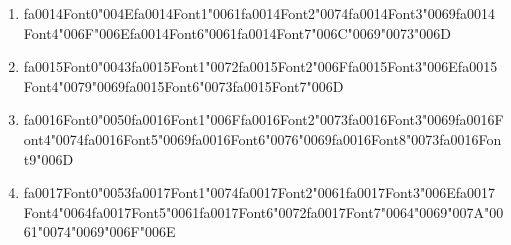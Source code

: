 \documentclass[12pt]{article}
\begin{document}
\begin{enumerate}[label=\arabic*.]
\begin{enumerate}[label=(\alph*)]
    \item {\csname fa0014Font0\endcsname\char"004E}{\csname fa0014Font1\endcsname\char"0061}{\csname fa0014Font2\endcsname\char"0074}{\csname fa0014Font3\endcsname\char"0069}{\csname fa0014Font4\endcsname\char"006F}{\char"006E}{\csname fa0014Font6\endcsname\char"0061}{\csname fa0014Font7\endcsname\char"006C}{\char"0069}{\char"0073}{\char"006D}
    \item {\csname fa0015Font0\endcsname\char"0043}{\csname fa0015Font1\endcsname\char"0072}{\csname fa0015Font2\endcsname\char"006F}{\csname fa0015Font3\endcsname\char"006E}{\csname fa0015Font4\endcsname\char"0079}{\char"0069}{\csname fa0015Font6\endcsname\char"0073}{\csname fa0015Font7\endcsname\char"006D}
    \item {\csname fa0016Font0\endcsname\char"0050}{\csname fa0016Font1\endcsname\char"006F}{\csname fa0016Font2\endcsname\char"0073}{\csname fa0016Font3\endcsname\char"0069}{\csname fa0016Font4\endcsname\char"0074}{\csname fa0016Font5\endcsname\char"0069}{\csname fa0016Font6\endcsname\char"0076}{\char"0069}{\csname fa0016Font8\endcsname\char"0073}{\csname fa0016Font9\endcsname\char"006D}
    \item {\csname fa0017Font0\endcsname\char"0053}{\csname fa0017Font1\endcsname\char"0074}{\csname fa0017Font2\endcsname\char"0061}{\csname fa0017Font3\endcsname\char"006E}{\csname fa0017Font4\endcsname\char"0064}{\csname fa0017Font5\endcsname\char"0061}{\csname fa0017Font6\endcsname\char"0072}{\csname fa0017Font7\endcsname\char"0064}{\char"0069}{\char"007A}{\char"0061}{\char"0074}{\char"0069}{\char"006F}{\char"006E}
\end{enumerate}
\end{enumerate}
\end{document}
